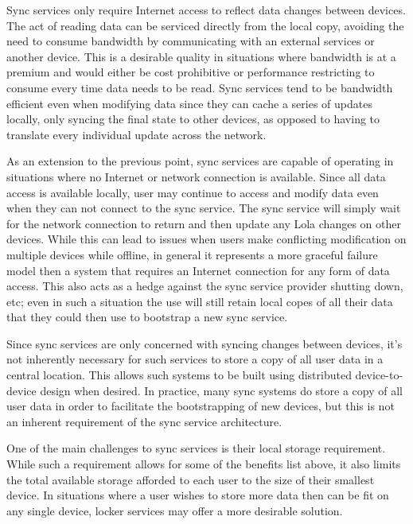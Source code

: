 \begin{packed_desc}
\item[Bandwidth Efficient:] Sync services only require Internet access
  to reflect data changes between devices. The act of reading data can
  be serviced directly from the local copy, avoiding the need to
  consume bandwidth by communicating with an external services or
  another device. This is a desirable quality in situations where
  bandwidth is at a premium and would either be cost prohibitive or
  performance restricting to consume every time data needs to be
  read. Sync services tend to be bandwidth efficient even when
  modifying data since they can cache a series of updates locally,
  only syncing the final state to other devices, as opposed to having
  to translate every individual update across the network.
\item[Offline Support:] As an extension to the previous point, sync
  services are capable of operating in situations where no Internet or
  network connection is available. Since all data access is available
  locally, user may continue to access and modify data even when they
  can not connect to the sync service. The sync service will simply
  wait for the network connection to return and then update any Lola
  changes on other devices. While this can lead to issues when users
  make conflicting modification on multiple devices while offline, in
  general it represents a more graceful failure model then a system
  that requires an Internet connection for any form of data
  access. This also acts as a hedge against the sync service provider
  shutting down, etc; even in such a situation the use will still
  retain local copes of all their data that they could then use to
  bootstrap a new sync service.
\item[No Central Storage:] Since sync services are only concerned with
  syncing changes between devices, it's not inherently necessary for
  such services to store a copy of all user data in a central
  location. This allows such systems to be built using distributed
  device-to-device design when desired. In practice, many sync systems
  do store a copy of all user data in order to facilitate the
  bootstrapping of new devices, but this is not an inherent
  requirement of the sync service architecture.
\end{packed_desc}

One of the main challenges to sync services is their local storage
requirement. While such a requirement allows for some of the benefits
list above, it also limits the total available storage afforded to
each user to the size of their smallest device. In situations where a
user wishes to store more data then can be fit on any single device,
locker services may offer a more desirable solution.

